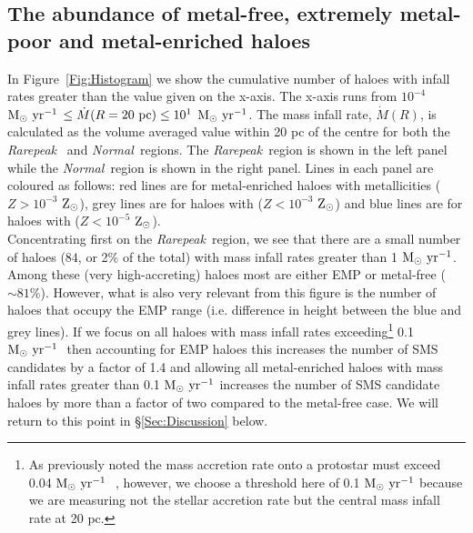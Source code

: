 \documentclass[twocolumn,iop,revtex4]{openjournal}
\newcommand{\msolaryr} {$\rm{M_{\odot}~yr^{-1}}~$}
\newcommand{\msolaryrc} {$\rm{M_{\odot}~yr^{-1}}$}
\newcommand{\zsolarc} {$\rm{Z_{\odot}}$}
\newcommand{\rarepeak} {\textit{Rarepeak~}}
\newcommand{\normal} {\textit{Normal~}}
\begin{document}
\subsection{The abundance of metal-free, extremely metal-poor and metal-enriched haloes}
In Figure~\ref{Fig:Histogram} we show the cumulative number of haloes with infall rates greater than
the value given on the x-axis. The x-axis runs from
$10^{-4}$ \msolaryr $\leq \dot{M}(R=20~{\rm pc}) \leq 10^{1}$ \msolaryrc. 
 The mass infall rate,
$\dot{M}(R)$, is calculated as the volume averaged value within 20 pc of the centre for both the \rarepeak 
and \normal regions. The
\rarepeak region is shown in the left panel while the \normal region is shown in the right 
panel. Lines in each panel are coloured as follows: red lines are for metal-enriched haloes with
metallicities ($Z > 10^{-3}$ \zsolarc), grey lines are for haloes with ($Z < 10^{-3}$ \zsolarc) and
blue lines are for haloes with ($Z < 10^{-5}$ \zsolarc).\\
\indent Concentrating first on the \rarepeak region, we see that there are a small number of
haloes ($84$, or 2\% of the total) with mass infall rates greater than 1 \msolaryrc. Among these (very high-accreting)
haloes most are either EMP or metal-free ($\sim 81$\%). However, what is also very relevant from this figure
is the number of haloes that occupy the EMP range (i.e. difference in height between the
blue and grey lines). If we focus on all haloes with mass infall rates
exceeding\footnote{As previously noted the mass accretion rate onto a protostar must exceed 0.04 \msolaryr
  \cite{Sakurai_2016}, however, we choose a threshold here of 0.1 \msolaryr because we are measuring not the
  stellar accretion rate but the central mass infall rate at 20 pc.}  0.1
\msolaryr
then accounting for EMP
haloes this increases the number of SMS candidates by a factor of 1.4 and allowing all metal-enriched haloes
with mass infall rates greater than 0.1 \msolaryr increases the number of SMS candidate haloes
by more than a factor of two
compared to the metal-free case. We will return to this point in \S \ref{Sec:Discussion} below. \\
\end{document}
